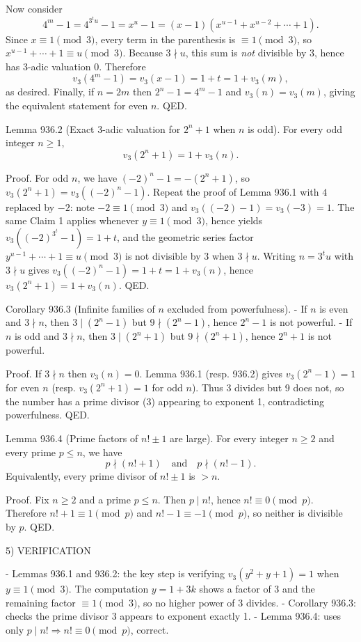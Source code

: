 Now consider
\[4^{m}-1 = 4^{3^t u}-1 = x^{u}-1 = (x-1)(x^{u-1}+x^{u-2}+\cdots+1).
\]
Since \(x\equiv 1\pmod 3\), every term in the parenthesis is \(\equiv 1\pmod 3\), so
\(x^{u-1}+\cdots+1 \equiv u \pmod 3\). Because \(3\nmid u\), this sum is \emph{not} divisible by 3, hence has 3-adic valuation 0. Therefore
\[v_3(4^{m}-1)=v_3(x-1)=1+t=1+v_3(m),
\]
as desired. Finally, if \(n=2m\) then \(2^n-1=4^m-1\) and \(v_3(n)=v_3(m)\), giving the equivalent statement for even \(n\). QED.

Lemma 936.2 (Exact 3-adic valuation for \(2^{n}+1\) when \(n\) is odd).
For every odd integer \(n\ge 1\),
\[v_3(2^{n}+1)=1+v_3(n).\]

Proof.
For odd \(n\), we have \((-2)^n-1 = -(2^n+1)\), so \(v_3(2^n+1)=v_3((-2)^n-1)\).
Repeat the proof of Lemma 936.1 with \(4\) replaced by \(-2\): note \(-2\equiv 1\pmod 3\) and \(v_3((-2)-1)=v_3(-3)=1\). The same Claim 1 applies whenever \(y\equiv 1\pmod 3\), hence yields
\(v_3((-2)^{3^t}-1)=1+t\), and the geometric series factor \(y^{u-1}+\cdots+1\equiv u\pmod 3\) is not divisible by 3 when \(3\nmid u\). Writing \(n=3^t u\) with \(3\nmid u\) gives \(v_3((-2)^n-1)=1+t=1+v_3(n)\), hence \(v_3(2^n+1)=1+v_3(n)\). QED.

Corollary 936.3 (Infinite families of \(n\) excluded from powerfulness).
- If \(n\) is even and \(3\nmid n\), then \(3\mid (2^n-1)\) but \(9\nmid (2^n-1)\), hence \(2^n-1\) is not powerful.
- If \(n\) is odd and \(3\nmid n\), then \(3\mid (2^n+1)\) but \(9\nmid (2^n+1)\), hence \(2^n+1\) is not powerful.

Proof.
If \(3\nmid n\) then \(v_3(n)=0\). Lemma 936.1 (resp. 936.2) gives \(v_3(2^n-1)=1\) for even \(n\) (resp. \(v_3(2^n+1)=1\) for odd \(n\)). Thus 3 divides but 9 does not, so the number has a prime divisor (3) appearing to exponent 1, contradicting powerfulness. QED.

Lemma 936.4 (Prime factors of \(n!\pm 1\) are large).
For every integer \(n\ge 2\) and every prime \(p\le n\), we have
\[p\nmid (n!+1)\quad\text{and}\quad p\nmid (n!-1).\]
Equivalently, every prime divisor of \(n!\pm 1\) is \(>n\).

Proof.
Fix \(n\ge 2\) and a prime \(p\le n\). Then \(p\mid n!\), hence \(n!\equiv 0\pmod p\). Therefore \(n!+1\equiv 1\pmod p\) and \(n!-1\equiv -1\pmod p\), so neither is divisible by \(p\). QED.

5) VERIFICATION

- Lemmas 936.1 and 936.2: the key step is verifying \(v_3(y^2+y+1)=1\) when \(y\equiv 1\pmod 3\). The computation \(y=1+3k\) shows a factor of 3 and the remaining factor \(\equiv 1\pmod 3\), so no higher power of 3 divides.
- Corollary 936.3: checks the prime divisor 3 appears to exponent exactly 1.
- Lemma 936.4: uses only \(p\mid n!\Rightarrow n!\equiv 0\pmod p\), correct.

